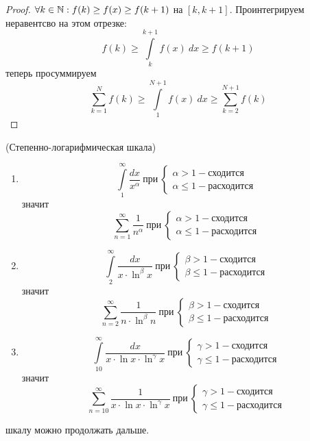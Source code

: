 \begin{proof}
    $\forall k\in \mathbb{N}: f(k)\geq f(x)\geq f(k+1)$ на $[k, k+1]$. Проинтегрируем неравентсво на этом отрезке:
    \[f(k)\geq \int\limits_{k}^{k+1}f(x)\ dx\geq f(k+1)\]
    теперь просуммируем
    \[\sum_{k=1}^{N}f(k)\geq \int\limits_{1}^{N+1}f(x)\ dx\geq \sum_{k=2}^{N+1}f(k)\]
\end{proof}
\newpage
\begin{example}(Степенно-логарифмическая шкала)
    \begin{enumerate}
        \item 
    \[\int\limits_{1}^{\infty}\frac{dx}{x^{\alpha}}\ \text{при}\ 
    \begin{cases}
        \alpha>1 - \text{сходится}\\
        \alpha\leq 1 - \text{расходится}
    \end{cases}\]
    значит
    \[\sum_{n=1}^{\infty}\frac{1}{n^{\alpha}}\ \text{при}\ 
    \begin{cases}
        \alpha>1 - \text{сходится}\\
        \alpha\leq 1 - \text{расходится}
    \end{cases}\]
    \item
    \[\int\limits_{2}^{\infty}\frac{dx}{x\cdot \ln^{\beta}{x}}\ \text{при}\ 
    \begin{cases}
        \beta>1 - \text{сходится}\\
        \beta\leq 1 - \text{расходится}
    \end{cases}\]
    значит
    \[\sum_{n=2}^{\infty}\frac{1}{n\cdot \ln^{\beta}{n}}\ \text{при}\ 
    \begin{cases}
        \beta>1 - \text{сходится}\\
        \beta\leq 1 - \text{расходится}
    \end{cases}\]
    \item
    \[\int\limits_{10}^{\infty}\frac{dx}{x\cdot \ln{x}\cdot \ln^{\gamma}{x}}\ \text{при}\ 
    \begin{cases}
        \gamma>1 - \text{сходится}\\
        \gamma\leq 1 - \text{расходится}
    \end{cases}\]
    значит
    \[\sum_{n=10}^{\infty}\frac{1}{x\cdot \ln{x}\cdot \ln^{\gamma}{x}}\ \text{при}\ 
    \begin{cases}
        \gamma>1 - \text{сходится}\\
        \gamma\leq 1 - \text{расходится}
    \end{cases}\]
    \end{enumerate}
    шкалу можно продолжать дальше.
\end{example}
